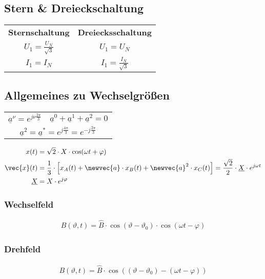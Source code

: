\begin{sectionbox}
\subsection{Stern \& Dreieckschaltung}
\begin{emphbox}
\begin{tabularx}{\columnwidth}{C |C}
\textbf{Sternschaltung} & \textbf{Dreiecksschaltung}\\
$U_1 = \frac{U_N}{\sqrt{3}}$ & $U_1 = U_N$\\
$I_1 = I_N$ & $I_1 = \frac{I_N}{\sqrt{3}}$\\
\end{tabularx}
\end{emphbox}
\end{sectionbox}

\begin{sectionbox}
\subsection{Allgemeines zu Wechselgrößen}
\begin{symbolbox}
\begin{tabularx}{\columnwidth}{CC}
$\underline{a}^\nu = e^{j\nu\frac{2\pi}{3}}$ & $\underline{a}^0 + \underline{a}^1 + \underline{a}^2 = 0$\\
\end{tabularx}
\end{symbolbox}
\begin{align*}
x(t) &= \sqrt{2}\cdot X\cdot\cos(\omega t + \varphi)\\
\vec{x}(t) &= \frac{1}{3}\cdot\left[x_A(t) + \newvec{a}\cdot x_B(t) + \newvec{a}^2\cdot x_C(t) \right] = \frac{\sqrt{2}}{2}\cdot\underline X\cdot e^{j\omega t}\\
\underline{X} &= X\cdot e^{j\varphi}
\end{align*}

\subsubsection{Wechselfeld}
\begin{align*}
B(\vartheta,t) = \hat{B}\cdot\cos(\vartheta - \vartheta_0)\cdot\cos(\omega t - \varphi)
\end{align*}

\subsubsection{Drehfeld}
\begin{align*}
B(\vartheta,t) = \hat{B}\cdot\cos((\vartheta - \vartheta_0) - (\omega t - \varphi))
\end{align*}
\end{sectionbox}

